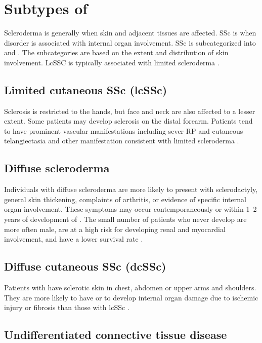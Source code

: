 \section{Subtypes of \ssc}

Scleroderma is generally when skin and adjacent tissues are affected. SSc is
when disorder is associated with internal organ involvement. SSc is
subcategorized into \lcSSc and \dcSSc. The subcategories are based on the
extent and distribution of skin involvement. LcSSC is typically associated
with limited scleroderma \citep{overviewSSc}.

\subsection{Limited cutaneous SSc (lcSSc)}

Sclerosis is restricted to the hands, but face and neck are also affected to a
lesser extent. Some patients may develop sclerosis on the distal forearm.
Patients tend to have prominent vascular manifestations including sever RP and
cutaneous telangiectasia and other manifestation consistent with limited
scleroderma \citep{overviewSSc}.

\subsection{Diffuse scleroderma}

Individuals with diffuse scleroderma are more likely to present with
sclerodactyly, general skin thickening, complaints of arthritis, or evidence
of specific internal organ involvement. These symptoms may occur
contemporaneously or within 1--2 years of development of \Rp. The small number
of patients who never develop \Rp are more often male, are at a high risk for
developing renal and myocardial involvement, and have a lower survival rate
\citep[1212]{kelley}.

\subsection{Diffuse cutaneous SSc (dcSSc)}

Patients with \dcSSc have sclerotic skin in chest, abdomen or upper arms and
shoulders. They are more likely to have or to develop internal organ damage
due to ischemic injury or fibrosis than those with lcSSc \citep{overviewSSc}.

\subsection{Undifferentiated connective tissue disease}

